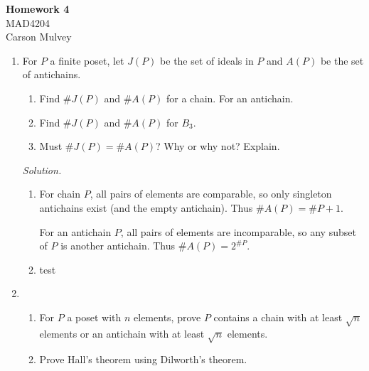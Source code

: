 \documentclass[11pt,letterpaper]{article}
\newenvironment{solution}{\color{blue}\textit{Solution.}}{\color{black}}
\begin{document}

\flushleft

\begin{center}
    \begin{large}
        \textbf{Homework 4} \\
        MAD4204 \\
        Carson Mulvey
    \end{large}
\end{center}

\pagestyle{empty}


\flushleft


\begin{enumerate}



\item For $P$ a finite poset, let $J(P)$ be the set of ideals in $P$ and $A(P)$ be the set of antichains.
\begin{enumerate}
	\item Find $\#J(P)$ and $\#A(P)$ for a chain. For an antichain.
	\item Find $\#J(P)$ and $\#A(P)$ for $B_3$.
	\item Must $\#J(P) = \#A(P)$? Why or why not? Explain.
\end{enumerate}
\begin{solution}
	\begin{enumerate}
		\item For chain $P$, all pairs of elements are comparable, so only singleton antichains exist (and the empty antichain). Thus $\#A(P)=\#P+1$.
		
		For an antichain $P$, all pairs of elements are incomparable, so any subset of $P$ is another antichain. Thus $\#A(P)=2^{\#P}$.
		\item test
	\end{enumerate}
\end{solution}


\item \begin{enumerate}
\item For $P$ a poset with $n$ elements, prove $P$ contains a chain with at least $\sqrt{n}$ elements or an antichain with at least $\sqrt{n}$ elements.
\item Prove Hall's theorem using Dilworth's theorem.
\end{enumerate}


\end{enumerate}
\end{document}
